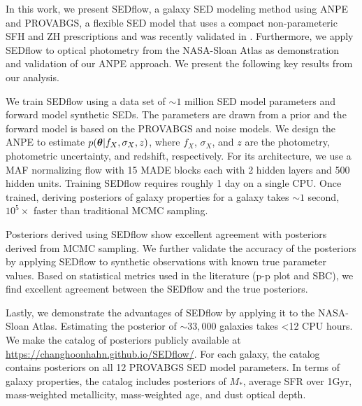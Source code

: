 In this work, we present {\sc SEDflow}, a galaxy SED modeling method using ANPE
and PROVABGS, a flexible SED model that uses a compact non-parameteric SFH and
ZH prescriptions and was recently validated in \cite{hahn2022}.
Furthermore, we apply {\sc SEDflow} to optical photometry from the NASA-Sloan
Atlas as demonstration and validation of our ANPE approach.  
We present the following key results from our analysis.
\begin{compactitem}
    \item We train {\sc SEDflow} using a data set of ${\sim}1$ million SED
        model parameters and forward model synthetic SEDs.
        The parameters are drawn from a prior and the forward model is based on
        the PROVABGS and noise models. 
        We design the ANPE to estimate $p(\boldsymbol{\theta} | f_X, \sigma_X, z)$, where
        $f_X$, $\sigma_X$, and $z$ are the photometry, photometric uncertainty,
        and redshift, respectively. 
        For its architecture, we use a MAF normalizing flow with 15 MADE blocks
        each with 2 hidden layers and 500 hidden units.
        Training {\sc SEDflow} requires roughly 1 day on a single CPU. 
        Once trained, deriving posteriors of galaxy properties for a galaxy
        takes ${\sim}1$ second, $10^5\times$ faster than traditional MCMC sampling. 
    \item Posteriors derived using {\sc SEDflow} show excellent agreement with
        posteriors derived from MCMC sampling. 
        We further validate the accuracy of the posteriors by applying  {\sc
        SEDflow} to synthetic observations with known true parameter values.  
        Based on statistical metrics used in the literature (p-p plot and SBC),
        we find excellent agreement between the {\sc SEDflow} and the true
        posteriors. 
    \item Lastly, we demonstrate the advantages of {\sc SEDflow} by applying it
        to the NASA-Sloan Atlas.
        Estimating the posterior of ${\sim}33,000$ galaxies takes <12 CPU hours. 
        We make the catalog of posteriors publicly available at
        \url{https://changhoonhahn.github.io/SEDflow/}. 
        For each galaxy, the catalog contains posteriors on all 12 PROVABGS
        SED model parameters.
        In terms of galaxy properties, the catalog includes posteriors of
        $M_*$, average SFR over 1Gyr, mass-weighted metallicity, mass-weighted
        age, and dust optical depth. 
\end{compactitem}

